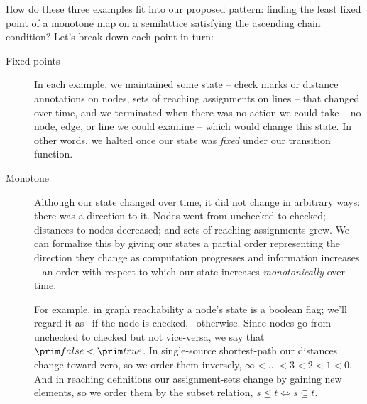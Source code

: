 \noindent
How do these three examples fit into our proposed pattern: finding the least fixed point of a monotone map on a semilattice satisfying the ascending chain condition? Let's break down each point in turn:

\begin{description}
\item[Fixed points]

  In each example, we maintained some state -- check marks or distance
  annotations on nodes, sets of reaching assignments on lines -- that changed
  over time, and we terminated when there was no action we could take -- no
  node, edge, or line we could examine -- which would change this state. In
  other words, we halted once our state was \emph{fixed} under our transition
  function.

\item[Monotone]

  Although our state changed over time, it did not change in arbitrary ways:
  there was a direction to it. Nodes went from unchecked to checked; distances
  to nodes decreased; and sets of reaching assignments grew.
%
  We can formalize this by giving our states a partial order representing the
  direction they change as computation progresses and information increases --
  an order with respect to which our state increases \emph{monotonically} over
  time.

  For example, in graph reachability a node's state is a boolean flag; we'll regard it as \etrue\ if the node is checked,
  \efalse\ otherwise.
%
  Since nodes go from unchecked to checked but not vice-versa, we say that
  $\efalse < \etrue$.
%
  In single-source shortest-path our distances change toward zero, so we order
  them inversely, $\infty < \hdots < 3 < 2 < 1 < 0$.
%
  And in reaching definitions our assignment-sets change by gaining new
  elements, so we order them by the subset relation, $s \le t \iff s \subseteq
  t$.




\end{description}
